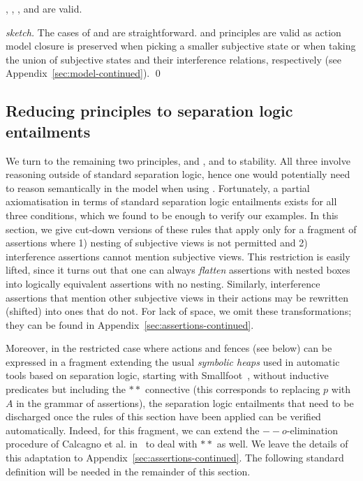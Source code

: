 \begin{lemma}
  \label{lem:assertion-facts}
  \forgetRule, \mergeRule, \weakenRule, and \copyRule are valid.
\end{lemma}
\begin{proof}[sketch]
  The cases of \weakenRule and \copyRule are
  straightforward. \forgetRule and \mergeRule principles are valid as action
  model closure is preserved when picking a smaller subjective state or
  when taking the union of subjective states and their interference
  relations, respectively (see Appendix~\ref{sec:model-continued}).
  \qed
\end{proof}


\subsection{Reducing \colosl principles to separation logic entailments}
\label{sec:prules}

We turn to the remaining two principles, \extendRule and \shiftRule,
and to stability. All three involve reasoning outside of standard
separation logic, hence one would potentially need to reason
semantically in the model when using \colosl. Fortunately, a partial
axiomatisation in terms of standard separation logic entailments
exists for all three conditions, which we found to be enough to verify
our examples. In this section, we give cut-down versions of these
rules that apply only for a fragment of \colosl assertions where 1)
nesting of subjective views is not permitted and 2) interference
assertions cannot mention subjective views. This restriction is easily
lifted, since it turns out that one can always \emph{flatten}
assertions with nested boxes into logically equivalent assertions with
no nesting. Similarly, interference assertions that mention other
subjective views in their actions may be rewritten (shifted) into ones
that do not. For lack of space, we omit these transformations; they
can be found in Appendix~\ref{sec:assertions-continued}.

Moreover, in the restricted case where actions and fences (see below)
can be expressed in a fragment extending the usual \emph{symbolic
  heaps} used in automatic tools based on separation logic, starting
with Smallfoot~\cite{smallfoot}, without inductive predicates but
including the $**$ connective (this corresponds to replacing $p$ with
$A$ in the grammar of assertions), the separation logic entailments
that need to be discharged once the rules of this section have been
applied can be verified automatically. Indeed, for this fragment, we
can extend the $--o$-elimination procedure of Calcagno et
al. in~\cite{vv07msc} to deal with $**$ as well. We leave the details
of this adaptation to Appendix~\ref{sec:assertions-continued}. The following standard definition will
be needed in the remainder of this section.

